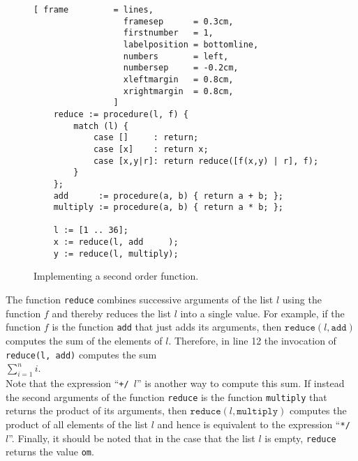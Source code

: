 \begin{figure}[!ht]
\centering
\begin{Verbatim}[ frame         = lines, 
                  framesep      = 0.3cm, 
                  firstnumber   = 1,
                  labelposition = bottomline,
                  numbers       = left,
                  numbersep     = -0.2cm,
                  xleftmargin   = 0.8cm,
                  xrightmargin  = 0.8cm,
                ]
    reduce := procedure(l, f) {
        match (l) {
            case []     : return;
            case [x]    : return x;
            case [x,y|r]: return reduce([f(x,y) | r], f);
        }    
    };
    add      := procedure(a, b) { return a + b; };
    multiply := procedure(a, b) { return a * b; };
    
    l := [1 .. 36];
    x := reduce(l, add     );
    y := reduce(l, multiply);
\end{Verbatim}
\vspace*{-0.3cm}
\caption{Implementing a second order function.}
\label{fig:reduce.stlx}
\end{figure}
The function \texttt{reduce} combines successive arguments of the list $l$ using the function $f$
and thereby reduces the list $l$ into a single value.  For example, if the function $f$ is the
function \texttt{add} that just adds its arguments, then $\texttt{reduce}(l,
\texttt{add})$ computes the sum of
the elements of $l$.  Therefore, in line 12 the invocation of
\texttt{reduce(l, add)} computes the sum
\\[0.2cm]
\hspace*{1.3cm}
 $\sum\limits_{i=1}^n i$. 
\\[0.2cm] 
Note that the expression ``\texttt{+/ $l$}'' is another way to compute this sum.
If instead the second arguments of the function \texttt{reduce} is the function
\texttt{multiply} that returns the product of its arguments, then 
$\texttt{reduce}(l, \texttt{multiply})$ computes the product of all elements of the list
$l$ and hence is equivalent to the expression ``\texttt{*/ $l$}''.
Finally, it should be noted that in the case that the list $l$ is empty,
\texttt{reduce} returns the value \texttt{om}. 


